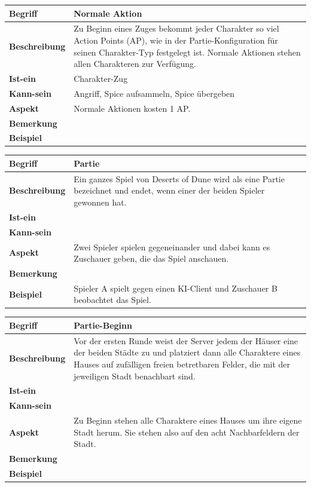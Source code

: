 \documentclass[12pt]{article}
\begin{document}
\begin{tabularx}{16cm}{|l|X|}
\hline
\textbf{Begriff} & \textbf{Normale Aktion} \\
\hline
\textbf{Beschreibung} & Zu Beginn eines Zuges bekommt jeder Charakter so viel Action Points (AP), wie in der Partie-Konfiguration für seinen Charakter-Typ festgelegt ist. Normale Aktionen stehen allen Charakteren zur Verfügung.\\
\hline
\textbf{Ist-ein} & Charakter-Zug\\
\hline
\textbf{Kann-sein} & Angriff, Spice aufsammeln, Spice übergeben\\
\hline
\textbf{Aspekt} & Normale Aktionen kosten 1 AP.\\
\hline
\textbf{Bemerkung} &  \\
\hline
\textbf{Beispiel} &  \\
\hline
\end{tabularx}

\begin{tabularx}{16cm}{|l|X|}
\hline
\textbf{Begriff} & \textbf{Partie} \\
\hline
\textbf{Beschreibung} & Ein ganzes Spiel von Deserts of Dune wird als eine Partie bezeichnet und endet, wenn einer der beiden Spieler gewonnen hat. \\
\hline
\textbf{Ist-ein} & \\
\hline
\textbf{Kann-sein} & \\
\hline
\textbf{Aspekt} & Zwei Spieler spielen gegeneinander und dabei kann es Zuschauer geben, die das Spiel anschauen.\\
\hline
\textbf{Bemerkung} &  \\
\hline
\textbf{Beispiel} & Spieler A spielt gegen einen KI-Client und Zuschauer B beobachtet das Spiel. \\
\hline
\end{tabularx}

\begin{tabularx}{16cm}{|l|X|}
\hline
\textbf{Begriff} & \textbf{Partie-Beginn} \\
\hline
\textbf{Beschreibung} & Vor der ersten Runde weist der Server jedem der Häuser eine der beiden Städte zu und platziert dann alle Charaktere eines Hauses auf zufälligen freien betretbaren Felder, die mit der jeweiligen Stadt benachbart sind. \\
\hline
\textbf{Ist-ein} & \\
\hline
\textbf{Kann-sein} & \\
\hline
\textbf{Aspekt} & Zu Beginn stehen alle Charaktere eines Hauses um ihre eigene Stadt herum. Sie stehen also auf den acht Nachbarfeldern der Stadt.\\
\hline
\textbf{Bemerkung} &  \\
\hline
\textbf{Beispiel} &  \\
\hline
\end{tabularx}
\end{document}
